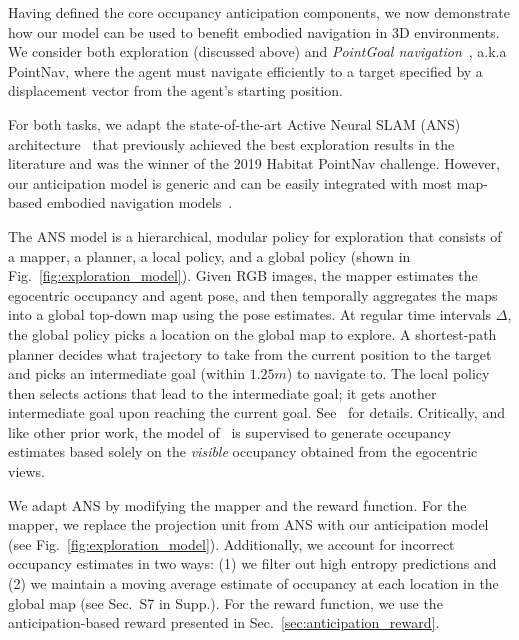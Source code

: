 \documentclass[runningheads]{llncs}
\begin{document}
Having defined the core occupancy anticipation components, we now demonstrate how our model can be used to benefit embodied navigation in 3D environments. We consider both exploration (discussed above) and \emph{PointGoal navigation}~\cite{savva2017minos,anderson2018evaluation}, a.k.a PointNav, where the agent must navigate efficiently to a target specified by a displacement vector from the agent's starting position.

For both tasks, we adapt the state-of-the-art Active Neural SLAM (ANS) architecture~\cite{chaplot2020learning} that previously achieved the best exploration results in the literature and was the winner of the 2019 Habitat PointNav challenge. However, our anticipation model is generic and can be easily integrated with most map-based embodied navigation models~\cite{gupta2017cognitive,chen2019learning,gan2019look}. 

The ANS model is a hierarchical, modular policy for exploration that consists of a mapper, a planner, a local policy, and a global policy (shown in Fig.~\ref{fig:exploration_model}). Given RGB images, the mapper estimates the egocentric occupancy and agent pose, and then temporally aggregates the maps into a global top-down map using the pose estimates. At regular time intervals $\Delta$, the global policy picks a location on the global map to explore. A shortest-path planner decides what trajectory to take from the current position to the target and picks an intermediate goal (within $1.25\si{m}$) to navigate to. The local policy then selects actions that lead to the intermediate goal; it gets another intermediate goal upon reaching the current goal. See~\cite{chaplot2020learning} for details.  Critically, and like other prior work, the model of~\cite{chaplot2020learning} is supervised to generate occupancy estimates based solely on the \emph{visible} occupancy obtained from the egocentric views.

We adapt ANS by modifying the mapper and the reward function. For the mapper, we replace the projection unit from ANS with our anticipation model (see Fig.~\ref{fig:exploration_model}). Additionally, we account for incorrect occupancy estimates in two ways: (1) we filter out high entropy predictions and (2) we maintain a moving average estimate of occupancy at each location in the global map (see Sec.~S7 in Supp.). For the reward function, we use the anticipation-based reward presented in Sec.~\ref{sec:anticipation_reward}.
\end{document}
